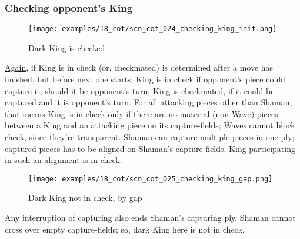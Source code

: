 \clearpage %

\subsubsection*{Checking opponent's King}
\label{sec:Conquest of Tlalocan/Shaman/Movement/Checking opponent's King}

\vspace*{-1.5\baselineskip}
\noindent
\begin{figure}[!h]
\texttt{[image: examples/18\_cot/scn\_cot\_024\_checking\_king\_init.png]}
\vspace*{-1.5\baselineskip}
\caption{Dark King is checked}
\label{fig:scn_cot_024_checking_king_init}
\end{figure}

\vspace*{-0.7\baselineskip}
\hyperref[fig:scn_tr_27_checking_king_pawns]{Again}, if King is in check (or,
checkmated) is determined after a move has finished, but before next one starts.\newline
\indent
King is in check if opponent's piece could capture it, should it be opponent's
turn; King is checkmated, if it could be captured and it is opponent's turn.\newline
\indent
For all attacking pieces other than Shaman, that means King is in check only if
there are no material (non-Wave) pieces between a King and an attacking piece on
its capture-fields; Waves cannot block check, since
\hyperref[fig:scn_mv_011_wave_is_transparent]{they’re transparent}.\newline
\indent
Shaman can \hyperref[fig:scn_cot_004_light_shaman_capture_ply]{capture multiple pieces}
in one ply; captured pieces has to be aligned on Shaman's capture-fields, King
participating in such an alignment is in check.

\vspace*{-1.1\baselineskip}
\noindent
\begin{figure}[!h]
\texttt{[image: examples/18\_cot/scn\_cot\_025\_checking\_king\_gap.png]}
\vspace*{-1.5\baselineskip}
\caption{Dark King not in check, by gap}
\label{fig:scn_cot_025_checking_king_gap}
\end{figure}

\vspace*{-0.7\baselineskip}
Any interruption of capturing also ends Shaman's capturing ply. Shaman cannot cross
over empty capture-fields; so, dark King here is not in check.

